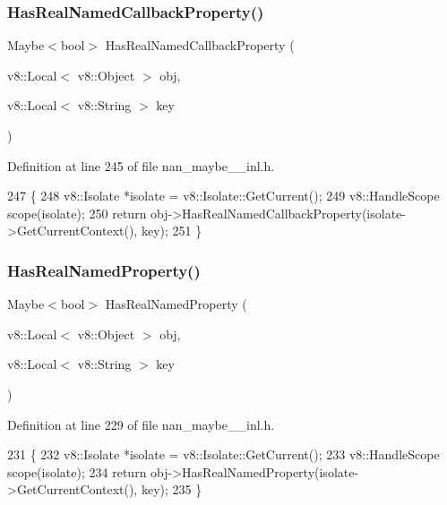 \subsubsection{Has\+Real\+Named\+Callback\+Property()}
{\footnotesize\ttfamily Maybe$<$bool$>$ Has\+Real\+Named\+Callback\+Property (\begin{DoxyParamCaption}\item[{v8\+::\+Local$<$ v8\+::\+Object $>$}]{obj,  }\item[{v8\+::\+Local$<$ v8\+::\+String $>$}]{key }\end{DoxyParamCaption})}



Definition at line 245 of file nan\+\_\+maybe\+\_\+\_\+inl.\+h.


\begin{DoxyCode}
247                            \{
248   v8::Isolate *isolate = v8::Isolate::GetCurrent();
249   v8::HandleScope scope(isolate);
250   \textcolor{keywordflow}{return} obj->HasRealNamedCallbackProperty(isolate->GetCurrentContext(), key);
251 \}
\end{DoxyCode}
\mbox{\label{nan__maybe__43__inl_8h_a9f276c1006f56d86336744a5a36bc909}} 
\subsubsection{Has\+Real\+Named\+Property()}
{\footnotesize\ttfamily Maybe$<$bool$>$ Has\+Real\+Named\+Property (\begin{DoxyParamCaption}\item[{v8\+::\+Local$<$ v8\+::\+Object $>$}]{obj,  }\item[{v8\+::\+Local$<$ v8\+::\+String $>$}]{key }\end{DoxyParamCaption})}



Definition at line 229 of file nan\+\_\+maybe\+\_\+\_\+inl.\+h.


\begin{DoxyCode}
231                            \{
232   v8::Isolate *isolate = v8::Isolate::GetCurrent();
233   v8::HandleScope scope(isolate);
234   \textcolor{keywordflow}{return} obj->HasRealNamedProperty(isolate->GetCurrentContext(), key);
235 \}
\end{DoxyCode}
\mbox{\label{nan__maybe__43__inl_8h_aaae2a31e690753798311c4e36f7ce553}} 
